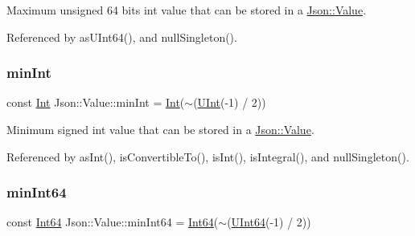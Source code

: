 Maximum unsigned 64 bits int value that can be stored in a \hyperlink{classJson_1_1Value}{Json\+::\+Value}. 



Referenced by as\+U\+Int64(), and null\+Singleton().

\mbox{\label{classJson_1_1Value_a7df8a39e2502b8c92a6a41e3d752d2c8_a7df8a39e2502b8c92a6a41e3d752d2c8}} 
\subsubsection{\texorpdfstring{min\+Int}{minInt}}
{\footnotesize\ttfamily const \hyperlink{classJson_1_1Value_abdf7a7ff73eb130ffcab28504ffdb405_abdf7a7ff73eb130ffcab28504ffdb405}{Int} Json\+::\+Value\+::min\+Int = \hyperlink{classJson_1_1Value_abdf7a7ff73eb130ffcab28504ffdb405_abdf7a7ff73eb130ffcab28504ffdb405}{Int}($\sim$(\hyperlink{classJson_1_1Value_a0933d59b45793ae4aade1757c322a98d_a0933d59b45793ae4aade1757c322a98d}{U\+Int}(-\/1) / 2))\hspace{0.3cm}{\ttfamily [static]}}



Minimum signed int value that can be stored in a \hyperlink{classJson_1_1Value}{Json\+::\+Value}. 



Referenced by as\+Int(), is\+Convertible\+To(), is\+Int(), is\+Integral(), and null\+Singleton().

\mbox{\label{classJson_1_1Value_a815ef899bc312c93bc426511acfe31a7_a815ef899bc312c93bc426511acfe31a7}} 
\subsubsection{\texorpdfstring{min\+Int64}{minInt64}}
{\footnotesize\ttfamily const \hyperlink{classJson_1_1Value_a1b86af9f85f0f1baa972c3319fa22695_a1b86af9f85f0f1baa972c3319fa22695}{Int64} Json\+::\+Value\+::min\+Int64 = \hyperlink{classJson_1_1Value_a1b86af9f85f0f1baa972c3319fa22695_a1b86af9f85f0f1baa972c3319fa22695}{Int64}($\sim$(\hyperlink{classJson_1_1Value_a8b62564be8c087c6d18de180ff4e13e3_a8b62564be8c087c6d18de180ff4e13e3}{U\+Int64}(-\/1) / 2))\hspace{0.3cm}{\ttfamily [static]}}




